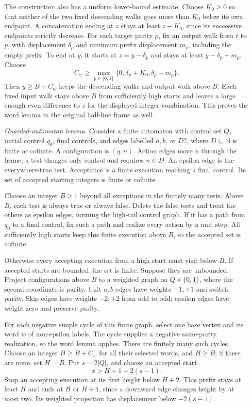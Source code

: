 The construction also has a uniform lower-bound
estimate. Choose \(K_0\geq0\) so that neither of
the two fixed descending walks goes more than
\(K_0\) below its own endpoint. A concatenation
ending at \(z\) stays at least \(z-K_0\), since
its successive endpoints strictly decrease.
For each target parity \(p\), fix an output walk
from \(t\) to \(p\), with displacement \(\delta_p\)
and minimum prefix displacement \(m_p\), including
the empty prefix. To end at \(y\), it starts at
\(z=y-\delta_p\) and stays at least
\(y-\delta_p+m_p\). Choose
\[
 C_w\geq\max_{p\in\{0,1\}}
             \{0,\delta_p+K_0,\delta_p-m_p\}.
\]
Then \(y\geq B+C_w\) keeps the descending walks
and output walk above \(B\). Each fixed input
walk stays above \(B\) from sufficiently high
starts and leaves a large enough even difference
to \(z\) for the displayed integer combination.
This proves the word lemma in the original
half-line frame as well.

\emph{Guarded-automaton lemma.}
Consider a finite automaton with control set \(Q\),
initial control \(q_0\), final controls, and edges
labelled \(a,b\), or \(D?\), where \(D\subseteq
\mathbb N\) is finite or cofinite. A configuration
is \((q,n)\). Action edges move \(n\) through the
frame; a test changes only control and requires
\(n\in D\). An epsilon edge is the everywhere-true
test. Acceptance is a finite execution reaching
a final control. Its set of accepted starting
integers is finite or cofinite.

Choose an integer \(B\geq1\) beyond all exceptions in the
finitely many tests. Above \(B\), each test is
always true or always false. Delete the false
tests and treat the others as epsilon edges,
forming the high-tail control graph.
If it has a path from \(q_0\) to a final control,
fix such a path and realize every action by a
unit step. All sufficiently high starts keep
this finite execution above \(B\), so the
accepted set is cofinite.

Otherwise every accepting execution from a high
start must visit below \(B\). If accepted starts
are bounded, the set is finite. Suppose they
are unbounded. Project configurations above
\(B\) to a weighted graph on
\(Q\times\{0,1\}\), where the second coordinate
is parity. Unit \(a,b\) edges have weights
\(-1,+1\) and switch parity. Skip edges have
weights \(-2,+2\) from odd to odd; epsilon
edges have weight zero and preserve parity.

For each negative simple cycle of this finite
graph, select one base vertex and its word \(w\)
of non-epsilon labels. The cycle supplies a
negative same-parity realization, so the word
lemma applies. There are finitely many such
cycles. Choose an integer \(H\geq B+C_w\) for all their
selected words, and \(H\geq B\); if there are
none, set \(H=B\).
Put \(s=2|Q|\), and choose an accepted start
\[
 x>H+1+2(s-1).
\]
Stop an accepting execution at its first height
below \(H+2\). This prefix stays at least \(H\)
and ends at \(H\) or \(H+1\), since a downward
edge changes height by at most two. Its weighted
projection has displacement below \(-2(s-1)\).

